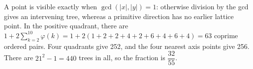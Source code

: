 A point is visible exactly when $\gcd(|x|,|y|)=1$: otherwise division by the gcd gives an intervening tree, whereas a primitive direction has no earlier lattice point. In the positive quadrant, there are $1+2\sum_{k=2}^{10}\varphi(k)=1+2(1+2+2+4+2+6+4+6+4)=63$ coprime ordered pairs. Four quadrants give 252, and the four nearest axis points give 256. There are $21^2-1=440$ trees in all, so the fraction is $\boxed{\dfrac{32}{55}}$.
